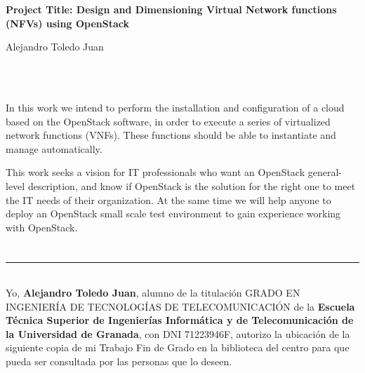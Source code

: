 \cleardoublepage


\thispagestyle{empty}


\begin{center}
{\large\bfseries Project Title: Design and Dimensioning Virtual Network functions (NFVs) using OpenStack}\\
\end{center}
\begin{center}
Alejandro Toledo Juan\\
\end{center}

\\

\vspace{0.7cm}
\\


In this work we intend to perform the installation and configuration of a cloud based on the OpenStack software, in order to execute a series of virtualized network functions (VNFs). These functions should be able to instantiate and manage automatically.

This work seeks a vision for IT professionals who want an
OpenStack general-level description, and know if OpenStack
is the solution for the right one to meet the IT needs of their organization. At the same time we will help anyone
to deploy an OpenStack  small scale test environment to gain experience working with OpenStack.




\chapter*{}
\thispagestyle{empty}

\noindent\rule[-1ex]{\textwidth}{2pt}\\[4.5ex]

Yo, \textbf{Alejandro Toledo Juan}, alumno de la titulación GRADO EN INGENIERÍA DE TECNOLOGÍAS DE TELECOMUNICACIÓN  de la \textbf{Escuela Técnica Superior
de Ingenierías Informática y de Telecomunicación de la Universidad de Granada}, con DNI 71223946F, autorizo la ubicación de la siguiente copia de mi Trabajo Fin de Grado en la biblioteca del centro para que pueda ser consultada por las personas que lo deseen.

